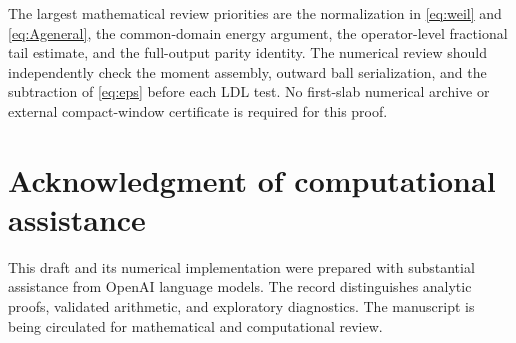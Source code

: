 \documentclass[11pt]{article}
\numberwithin{equation}{section}
\theoremstyle{definition}
\theoremstyle{remark}
\begin{document}
The largest mathematical review priorities are the normalization in
\eqref{eq:weil} and \eqref{eq:Ageneral}, the common-domain energy argument,
the operator-level fractional tail estimate, and the full-output parity
identity. The numerical review should independently check the moment
assembly, outward ball serialization, and the subtraction of
\eqref{eq:eps} before each LDL test. No first-slab numerical archive or
external compact-window certificate is required for this proof.

\section*{Acknowledgment of computational assistance}
This draft and its numerical implementation were prepared with substantial
assistance from OpenAI language models. The record distinguishes analytic
proofs, validated arithmetic, and exploratory diagnostics. The manuscript
is being circulated for mathematical and computational review.



\end{document}
